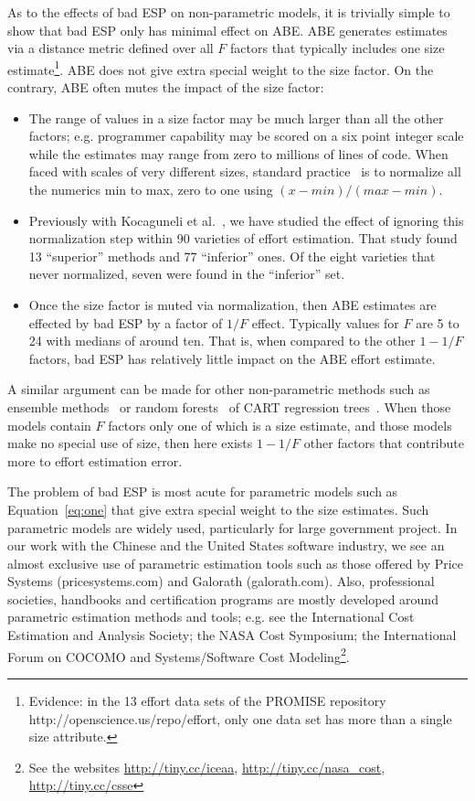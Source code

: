 \documentclass[final,twocolumn]{elsarticle}
\newcommand{\etal}{et al.}
\newcommand{\bi}{\begin{itemize}[leftmargin=0.4cm]}
\newcommand{\ei}{\end{itemize}}
\newcommand{\eq}[1]{Equation~\ref{eq:#1}}
\theoremstyle{break}
\begin{document}
As to the effects of bad ESP on  non-parametric models, it is
 trivially simple to show that bad ESP only has minimal effect on ABE.
 ABE generates estimates via a distance metric
 defined over all $F$ factors that typically includes one size estimate\footnote{Evidence:
   in the 13  effort data sets of the PROMISE repository http://openscience.us/repo/effort, only one data set has more than a single
   size attribute.}. ABE does not give extra special weight to the size factor.
 On the contrary, ABE often mutes the impact of the size factor:
 \bi
 \item
The range of values in a size factor may be much larger than all the other factors; e.g. programmer
 capability may be scored on a six point integer scale while the estimates may
 range from zero to millions of lines of code. When faced with scales of very
 different sizes, standard practice~\cite{koc11b,aha1991instance} is to
 normalize all the numerics min to max, zero to one using
 \mbox{$(x-\mathit{min})/(\mathit{max} - \mathit{min})$}.
\item
  Previously with
 Kocaguneli \etal~\cite{Kocaguneli2012z}, we have studied the effect of ignoring this normalization
 step within 90 varieties of effort estimation. That study found 13 ``superior''
 methods and 77 ``inferior'' ones. Of the eight varieties that never normalized,
 seven were found in the ``inferior'' set.
\item
  Once the size factor is muted via normalization,
  then ABE estimates are effected by bad ESP by a factor of
   $1/F$ effect. Typically values for $F$ are 5 to 24
  with medians of around ten. That is, when compared to the other $1-1/F$ factors,  bad ESP has relatively
  little impact on the ABE effort estimate.
  \ei
A similar argument can be made for other non-parametric methods such as ensemble
methods~\cite{Kocaguneli2012z} or random forests~\cite{breiman2001random} of
CART regression trees~\cite{breiman1984classification}. When those models contain
$F$ factors only one of which is a size estimate, and those models make no
special use of size, then here exists $1-1/F$ other factors that contribute more
to effort estimation error.

The problem of bad ESP is most acute for parametric models such as \eq{one} that give
extra special weight to the size estimates.
Such parametric models are widely used, particularly for large government project.
In our work with the Chinese and the United States software industry,
we see an   almost exclusive
use  of parametric estimation tools such as those offered by 
Price Systems (pricesystems.com) and  Galorath (galorath.com).
Also,
professional societies, handbooks and
certification programs are mostly developed around 
parametric estimation methods and tools; e.g. see the 
International Cost Estimation and Analysis Society; the
NASA Cost Symposium;  the
International Forum on COCOMO and Systems/Software
Cost Modeling\footnote{See the websites \url{http://tiny.cc/iceaa}, \url{http://tiny.cc/nasa_cost}, \url{http://tiny.cc/csse}}.
\end{document}
